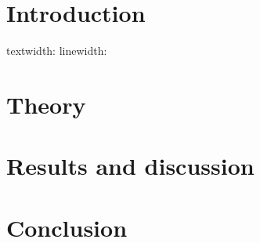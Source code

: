 \documentclass[a4paper,twocolumn]{article}
\begin{document}
\section*{Introduction}

textwidth: \prntlen{\textwidth}
linewidth: \prntlen{\linewidth}

\section*{Theory}


\section*{Results and discussion}


\section*{Conclusion}

\printbibliography[title=References]
\end{document}

